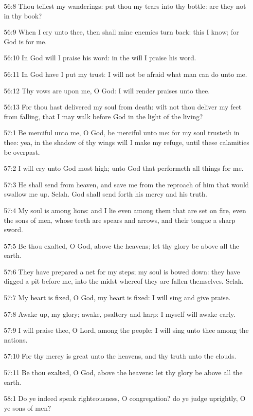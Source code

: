 56:8 Thou tellest my wanderings: put thou my tears into thy bottle:
are they not in thy book?

56:9 When I cry unto thee, then shall mine enemies turn back: this I
know; for God is for me.

56:10 In God will I praise his word: in the \LORD will I praise his
word.

56:11 In God have I put my trust: I will not be afraid what man can do
unto me.

56:12 Thy vows are upon me, O God: I will render praises unto thee.

56:13 For thou hast delivered my soul from death: wilt not thou
deliver my feet from falling, that I may walk before God in the light
of the living?



57:1 Be merciful unto me, O God, be merciful unto me: for my soul
trusteth in thee: yea, in the shadow of thy wings will I make my
refuge, until these calamities be overpast.

57:2 I will cry unto God most high; unto God that performeth all
things for me.

57:3 He shall send from heaven, and save me from the reproach of him
that would swallow me up. Selah. God shall send forth his mercy and
his truth.

57:4 My soul is among lions: and I lie even among them that are set on
fire, even the sons of men, whose teeth are spears and arrows, and
their tongue a sharp sword.

57:5 Be thou exalted, O God, above the heavens; let thy glory be above
all the earth.

57:6 They have prepared a net for my steps; my soul is bowed down:
they have digged a pit before me, into the midst whereof they are
fallen themselves. Selah.

57:7 My heart is fixed, O God, my heart is fixed: I will sing and give
praise.

57:8 Awake up, my glory; awake, psaltery and harp: I myself will awake
early.

57:9 I will praise thee, O Lord, among the people: I will sing unto
thee among the nations.

57:10 For thy mercy is great unto the heavens, and thy truth unto the
clouds.

57:11 Be thou exalted, O God, above the heavens: let thy glory be
above all the earth.



58:1 Do ye indeed speak righteousness, O congregation? do ye judge
uprightly, O ye sons of men?

